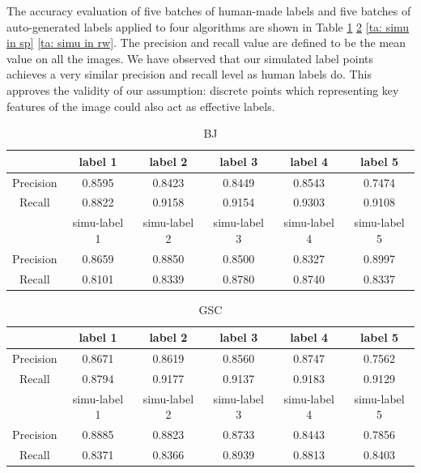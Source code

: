 \documentclass[runningheads,a4paper]{llncs}
\begin{document}
The accuracy evaluation of five batches of human-made labels and five batches of auto-generated labels applied to four algorithms are shown in Table  \ref{ta: simu in bj} \ref{ta: simu in gsc} \ref{ta: simu in sp} \ref{ta: simu in rw}. The precision and recall value are defined to be the mean value on all the images. We have observed that our simulated label points achieves a very similar precision and recall level as human labels do. This approves the validity of our assumption: discrete points which representing key features of the image could also act as effective labels.
\begin{table}
\centering
\begin{tabular}{|c|c|c|c|c|c|}
\hline
 & label 1 & label 2&label 3&label 4&label 5 \\
\hline
Precision& 0.8595 & 0.8423 & 0.8449& 0.8543& 0.7474 \\
\hline
Recall& 0.8822 & 0.9158 & 0.9154& 0.9303& 0.9108 \\
\hline
 & simu-label 1 & simu-label 2&simu-label 3&simu-label 4&simu-label 5 \\
 \hline
Precision& 0.8659 & 0.8850 & 0.8500& 0.8327& 0.8997 \\
\hline
Recall& 0.8101 & 0.8339 & 0.8780& 0.8740& 0.8337  \\
\hline
\end{tabular}
\caption{BJ}
\label{ta: simu in bj}
\end{table}


\begin{table}
\centering
\begin{tabular}{|c|c|c|c|c|c|}
\hline
 & label 1 & label 2&label 3&label 4&label 5 \\
  \hline
Precision& 0.8671 & 0.8619 & 0.8560& 0.8747& 0.7562 \\
\hline
Recall& 0.8794 & 0.9177 & 0.9137& 0.9183& 0.9129  \\
\hline
 & simu-label 1 & simu-label 2&simu-label 3&simu-label 4&simu-label 5 \\
\hline
Precision& 0.8885 & 0.8823 & 0.8733& 0.8443& 0.7856 \\
\hline
Recall& 0.8371 & 0.8366 & 0.8939& 0.8813& 0.8403 \\
\hline
\end{tabular}
\caption{GSC}
\label{ta: simu in gsc}
\end{table}
\end{document}
